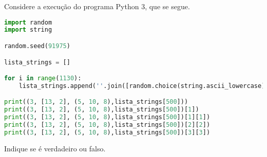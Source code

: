\documentclass[12pt,varwidth=16cm,border=17pt]{standalone}
\begin{document}
Considere a execução do programa Python 3, que se segue. 

\begin{lstlisting}[language=Python]
import random
import string

random.seed(91975)

lista_strings = []

for i in range(1130):
	lista_strings.append(''.join([random.choice(string.ascii_lowercase) for i in range(6)]))

print((3, [13, 2], (5, 10, 8),lista_strings[500]))
print((3, [13, 2], (5, 10, 8),lista_strings[500])[1])
print((3, [13, 2], (5, 10, 8),lista_strings[500])[1][1])
print((3, [13, 2], (5, 10, 8),lista_strings[500])[2][2])
print((3, [13, 2], (5, 10, 8),lista_strings[500])[3][3])
\end{lstlisting}

Indique se é verdadeiro ou falso.
\end{document}

